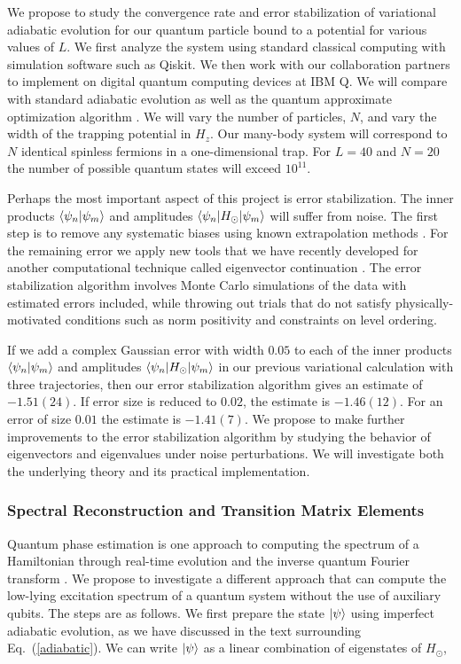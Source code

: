 \documentclass[10pt]{article}
\begin{document}
We propose to study the convergence rate and error stabilization of
variational adiabatic evolution for our quantum particle bound to a
potential for various values of $L$.  We first analyze the system
using standard classical computing with simulation software such as
Qiskit.  We then work with our collaboration partners to implement on
digital quantum computing devices at IBM Q.  We will
compare with standard adiabatic evolution as well as the quantum
approximate optimization algorithm \cite{Farhi:2014}. We will vary the
number of particles, $N$, and vary the width of the trapping potential
in $H_z$.  Our many-body system will correspond to $N$ identical
spinless fermions in a one-dimensional trap.  For $L = 40$ and $N =
20$ the number of possible quantum states will exceed $10^{11}$.

Perhaps the most important aspect of this project is error
stabilization.  The inner products $\braket{\psi_n|\psi_m}$ and
amplitudes $\braket{\psi_n|H_\odot|\psi_m}$ will suffer from noise.
The first step is to remove any systematic biases using known
extrapolation methods \cite{Kandala:2019}. For the remaining error we
apply new tools that we have recently developed for another
computational technique called eigenvector continuation
\cite{Frame:2017fah}.  The error stabilization algorithm involves
Monte Carlo simulations of the data with estimated errors included,
while throwing out trials that do not satisfy physically-motivated
conditions such as norm positivity and constraints on level ordering.
    
If we add a complex Gaussian error with width $0.05$ to each of the
inner products $\braket{\psi_n|\psi_m}$ and amplitudes
$\braket{\psi_n|H_\odot|\psi_m}$ in our previous variational
calculation with three trajectories, then our error stabilization
algorithm gives an estimate of $-1.51(24)$. If error size is reduced
to $0.02$, the estimate is $-1.46(12)$. For an error of size $0.01$
the estimate is $-1.41(7)$.  We propose to make further improvements
to the error stabilization algorithm by studying the behavior of
eigenvectors and eigenvalues under noise perturbations.  We will
investigate both the underlying theory and its practical
implementation.

\subsubsection{Spectral Reconstruction and Transition Matrix Elements}
     
Quantum phase estimation is one approach to computing the spectrum of
a Hamiltonian through real-time evolution and the inverse quantum
Fourier transform \cite{Abrams:1999}.  We propose to investigate a
different approach that can compute the low-lying excitation spectrum
of a quantum system without the use of auxiliary qubits.  The steps
are as follows.  We first prepare the state $\ket{\psi}$ using
imperfect adiabatic evolution, as we have discussed in the text
surrounding Eq.~(\ref{adiabatic}). We can write $\ket{\psi}$ as a
linear combination of eigenstates of $H_\odot$,
\end{document}

